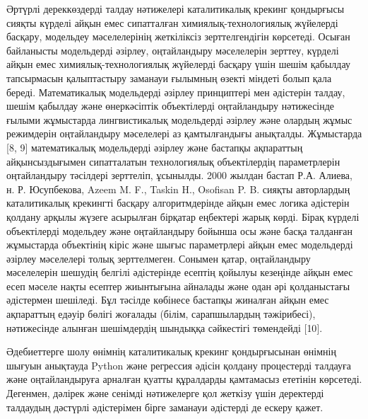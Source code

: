 \begin{multicols}{2}
Әртүрлі дереккөздерді талдау нәтижелері каталитикалық крекинг қондырғысы
сияқты күрделі айқын емес сипатталған химиялық-технологиялық жүйелерді
басқару, модельдеу мәселелерінің жеткіліксіз зерттелгендігін көрсетеді.
Осыған байланысты модельдерді әзірлеу, оңтайландыру мәселелерін зерттеу,
күрделі айқын емес химиялық-технологиялық жүйелерді басқару үшін шешім
қабылдау тапсырмасын қалыптастыру заманауи ғылымның өзекті міндеті болып
қала береді. Математикалық модельдерді әзірлеу принциптері мен әдістерін
талдау, шешім қабылдау және өнеркәсіптік объектілерді оңтайландыру
нәтижесінде ғылыми жұмыстарда лингвистикалық модельдерді әзірлеу және
олардың жұмыс режимдерін оңтайландыру мәселелері аз қамтылғандығы
анықталды. Жұмыстарда {[}8, 9{]} математикалық модельдерді әзірлеу және
бастапқы ақпараттың айқынсыздығымен сипатталатын технологиялық
объектілердің параметрлерін оңтайландыру тәсілдері зерттеліп, ұсынылды.
2000 жылдан бастап Р.А. Алиева, н. Р. Юсупбекова, Azeem M. F., Taskin
H., Osofisan P. B. сияқты авторлардың каталитикалық крекингті басқару
алгоритмдерінде айқын емес логика әдістерін қолдану арқылы жүзеге
асырылған бірқатар еңбектері жарық көрді. Бірақ күрделі объектілерді
модельдеу және оңтайландыру бойынша осы және басқа талданған жұмыстарда
объектінің кіріс және шығыс параметрлері айқын емес модельдерді әзірлеу
мәселелері толық зерттелмеген. Сонымен қатар, оңтайландыру мәселелерін
шешудің белгілі әдістерінде есептің қойылуы кезеңінде айқын емес есеп
мәселе нақты есептер жиынтығына айналады және одан әрі қолданыстағы
әдістермен шешіледі. Бұл тәсілде көбінесе бастапқы жиналған айқын емес
ақпараттың едәуір бөлігі жоғалады (білім, сарапшылардың тәжірибесі),
нәтижесінде алынған шешімдердің шындыққа сәйкестігі төмендейді {[}10{]}.

Әдебиеттерге шолу өнімнің каталитикалық крекинг қондырғысынан өнімнің
шығуын анықтауда Python және регрессия әдісін қолдану процестерді
талдауға және оңтайландыруға арналған қуатты құралдарды қамтамасыз
ететінін көрсетеді. Дегенмен, дәлірек және сенімді нәтижелерге қол
жеткізу үшін деректерді талдаудың дәстүрлі әдістерімен бірге заманауи
әдістерді де ескеру қажет.


\end{multicols}
